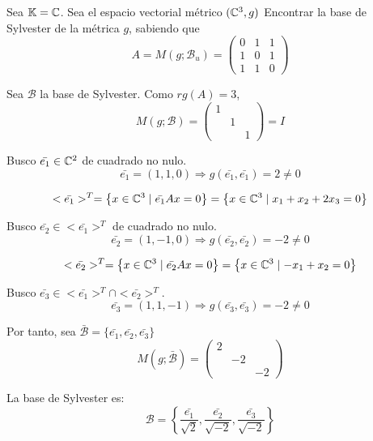 \begin{ejemplo}
    Sea $\mathbb{K}=\mathbb{C}$. Sea el espacio vectorial métrico $(\mathbb{C}^3, g)$ Encontrar la base de Sylvester de la métrica $g$, sabiendo que
    \begin{equation*}
        A = M(g; \mathcal{B}_u) = \left( \begin{array}{ccc}
            0 & 1 & 1\\
            1 & 0 & 1\\
            1 & 1 & 0
        \end{array} \right)
    \end{equation*}

    Sea $\mathcal{B}$ la base de Sylvester. Como $rg(A) = 3$,
    \begin{equation*}
        M(g; \mathcal{B}) = \left( \begin{array}{ccc}
            1 &  & \\
             & 1 & \\
             &  & 1
        \end{array} \right) = I
    \end{equation*}

    Busco $\bar{e_1} \in \mathbb{C}^2$ de cuadrado no nulo.
    $$\bar{e_1} = (1, 1, 0) \Longrightarrow g(\bar{e_1}, \bar{e_1}) = 2 \neq 0$$
    
    $$<\bar{e_1}>^T = \left\{ x\in \mathbb{C}^3 \mid \bar{e_1}Ax = 0 \right\} = \left\{ x\in \mathbb{C}^3 \mid x_1 + x_2 + 2x_3 = 0 \right\}$$

    Busco $\bar{e_2} \in <\bar{e_1}>^T$ de cuadrado no nulo.
    $$\bar{e_2} = (1, -1, 0) \Longrightarrow g(\bar{e_2}, \bar{e_2}) = -2 \neq 0$$

    $$<\bar{e_2}>^T = \left\{ x\in \mathbb{C}^3 \mid \bar{e_2}Ax = 0 \right\} = \left\{ x\in \mathbb{C}^3 \mid -x_1 + x_2 = 0 \right\}$$
    
    Busco $\bar{e_3} \in <\bar{e_1}>^T \cap <\bar{e_2}>^T$.
    $$\bar{e_3} = (1, 1, -1) \Longrightarrow g(\bar{e_3}, \bar{e_3}) = -2 \neq 0$$

    Por tanto, sea $\bar{\mathcal{B}} = \{\bar{e_1}, \bar{e_2}, \bar{e_3}\}$
    \begin{equation*}
        M(g; \bar{\mathcal{B}}) = \left( \begin{array}{ccc}
            2 &  & \\
             & -2 & \\
             &  & -2
        \end{array} \right)
    \end{equation*}

    La base de Sylvester es:
    \begin{equation*}
        \mathcal{B} = \left\{ \frac{\bar{e_1}}{\sqrt{2}}, \frac{\bar{e_2}}{\sqrt{-2}}, \frac{\bar{e_3}}{\sqrt{-2}} \right\}
    \end{equation*}
\end{ejemplo}

